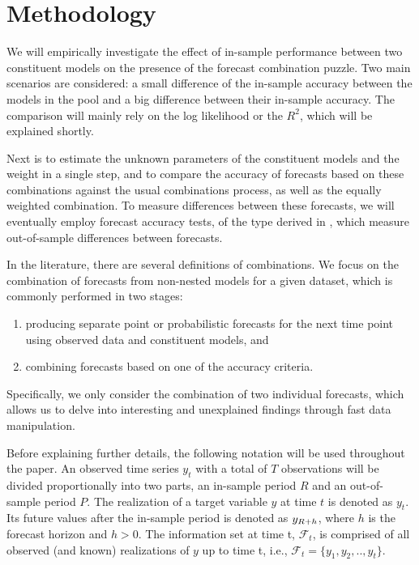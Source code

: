 \documentclass{monashthesis}
\begin{document}
\hypertarget{method}{%
\chapter{Methodology}\label{method}}

We will empirically investigate the effect of in-sample performance between two constituent models on the presence of the forecast combination puzzle. Two main scenarios are considered: a small difference of the in-sample accuracy between the models in the pool and a big difference between their in-sample accuracy. The comparison will mainly rely on the log likelihood or the \(R^2\), which will be explained shortly.

Next is to estimate the unknown parameters of the constituent models and the weight in a single step, and to compare the accuracy of forecasts based on these combinations against the usual combinations process, as well as the equally weighted combination. To measure differences between these forecasts, we will eventually employ forecast accuracy tests, of the type derived in \textcite{W96}, which measure out-of-sample differences between forecasts.

In the literature, there are several definitions of combinations. We focus on the combination of forecasts from non-nested models for a given dataset, which is commonly performed in two stages:

\begin{enumerate}
\def\labelenumi{\arabic{enumi}.}
\item
  producing separate point or probabilistic forecasts for the next time point using observed data and constituent models, and
\item
  combining forecasts based on one of the accuracy criteria.
\end{enumerate}

Specifically, we only consider the combination of two individual forecasts, which allows us to delve into interesting and unexplained findings through fast data manipulation.

Before explaining further details, the following notation will be used throughout the paper. An observed time series \(y_t\) with a total of \(T\) observations will be divided proportionally into two parts, an in-sample period \(R\) and an out-of-sample period \(P\). The realization of a target variable \(y\) at time \(t\) is denoted as \(y_t\). Its future values after the in-sample period is denoted as \(y_{\small{R+h}}\), where \(h\) is the forecast horizon and \(h>0\). The information set at time t, \(\mathcal{F}_t\), is comprised of all observed (and known) realizations of \(y\) up to time t, i.e., \(\mathcal{F}_t = \{y_1, y_2, .., y_t\}\).
\end{document}
